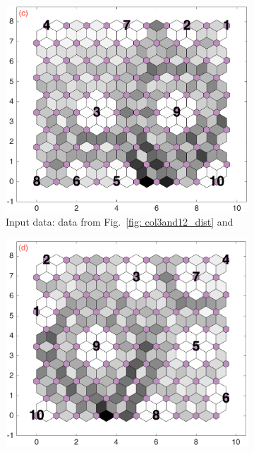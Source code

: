 \begin{figure}
\begin{subfigure}[b]{0.25\textwidth}
        \includegraphics[width=\textwidth]{../../images0.01/M31/2D/diff_dimension/combine_2D_data_between_cols3and13.png}
        \caption{Input data: data from Fig.~\ref{fig: col3and12_dist} and \sii}
        \label{fig: col3and13_dist}
    \end{subfigure}
        \hfill
    \begin{subfigure}[b]{0.25\textwidth}
        \centering
        \includegraphics[width=\textwidth]{../../images0.01/M31/2D/diff_dimension/combine_2D_data_between_cols3and14.png}

\end{subfigure}
\end{figure}
